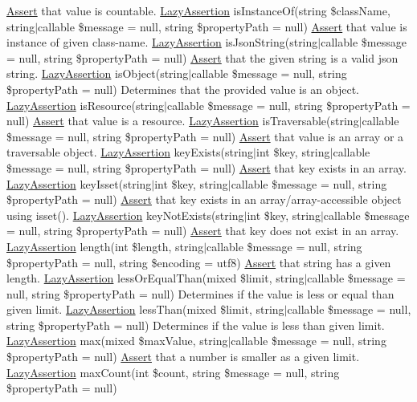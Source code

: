 \mbox{\hyperlink{class_assert_1_1_assert}{Assert}} that value is countable.  \mbox{\hyperlink{class_assert_1_1_lazy_assertion}{Lazy\+Assertion}} is\+Instance\+Of(string \$class\+Name, string$\vert$callable \$message = null, string \$property\+Path = null) \mbox{\hyperlink{class_assert_1_1_assert}{Assert}} that value is instance of given class-\/name.  \mbox{\hyperlink{class_assert_1_1_lazy_assertion}{Lazy\+Assertion}} is\+Json\+String(string$\vert$callable \$message = null, string \$property\+Path = null) \mbox{\hyperlink{class_assert_1_1_assert}{Assert}} that the given string is a valid json string.  \mbox{\hyperlink{class_assert_1_1_lazy_assertion}{Lazy\+Assertion}} is\+Object(string$\vert$callable \$message = null, string \$property\+Path = null) Determines that the provided value is an object.  \mbox{\hyperlink{class_assert_1_1_lazy_assertion}{Lazy\+Assertion}} is\+Resource(string$\vert$callable \$message = null, string \$property\+Path = null) \mbox{\hyperlink{class_assert_1_1_assert}{Assert}} that value is a resource.  \mbox{\hyperlink{class_assert_1_1_lazy_assertion}{Lazy\+Assertion}} is\+Traversable(string$\vert$callable \$message = null, string \$property\+Path = null) \mbox{\hyperlink{class_assert_1_1_assert}{Assert}} that value is an array or a traversable object.  \mbox{\hyperlink{class_assert_1_1_lazy_assertion}{Lazy\+Assertion}} key\+Exists(string$\vert$int \$key, string$\vert$callable \$message = null, string \$property\+Path = null) \mbox{\hyperlink{class_assert_1_1_assert}{Assert}} that key exists in an array.  \mbox{\hyperlink{class_assert_1_1_lazy_assertion}{Lazy\+Assertion}} key\+Isset(string$\vert$int \$key, string$\vert$callable \$message = null, string \$property\+Path = null) \mbox{\hyperlink{class_assert_1_1_assert}{Assert}} that key exists in an array/array-\/accessible object using isset().  \mbox{\hyperlink{class_assert_1_1_lazy_assertion}{Lazy\+Assertion}} key\+Not\+Exists(string$\vert$int \$key, string$\vert$callable \$message = null, string \$property\+Path = null) \mbox{\hyperlink{class_assert_1_1_assert}{Assert}} that key does not exist in an array.  \mbox{\hyperlink{class_assert_1_1_lazy_assertion}{Lazy\+Assertion}} length(int \$length, string$\vert$callable \$message = null, string \$property\+Path = null, string \$encoding = \textquotesingle{}utf8\textquotesingle{}) \mbox{\hyperlink{class_assert_1_1_assert}{Assert}} that string has a given length.  \mbox{\hyperlink{class_assert_1_1_lazy_assertion}{Lazy\+Assertion}} less\+Or\+Equal\+Than(mixed \$limit, string$\vert$callable \$message = null, string \$property\+Path = null) Determines if the value is less or equal than given limit.  \mbox{\hyperlink{class_assert_1_1_lazy_assertion}{Lazy\+Assertion}} less\+Than(mixed \$limit, string$\vert$callable \$message = null, string \$property\+Path = null) Determines if the value is less than given limit.  \mbox{\hyperlink{class_assert_1_1_lazy_assertion}{Lazy\+Assertion}} max(mixed \$max\+Value, string$\vert$callable \$message = null, string \$property\+Path = null) \mbox{\hyperlink{class_assert_1_1_assert}{Assert}} that a number is smaller as a given limit.  \mbox{\hyperlink{class_assert_1_1_lazy_assertion}{Lazy\+Assertion}} max\+Count(int \$count, string \$message = null, string \$property\+Path = null) 